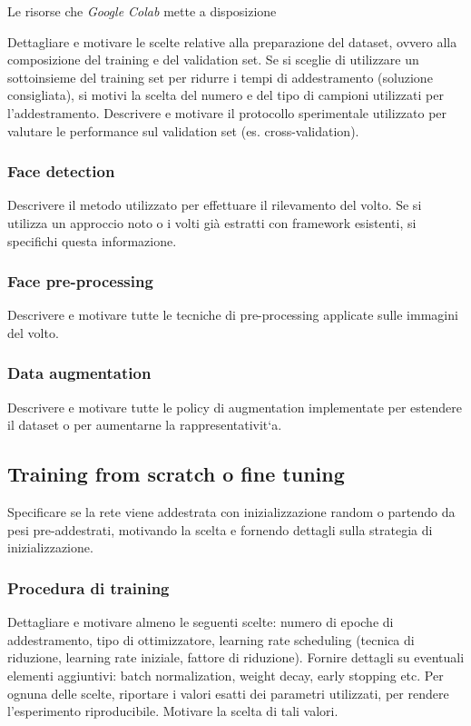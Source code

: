  Le risorse che \textit{Google Colab} mette a disposizione 

Dettagliare e motivare le scelte relative alla preparazione del dataset, ovvero alla composizione del training e del validation set. Se si sceglie di utilizzare un sottoinsieme del training set per ridurre i tempi di addestramento (soluzione consigliata), si motivi la scelta del numero e del tipo di campioni utilizzati per l’addestramento. Descrivere e motivare il protocollo sperimentale utilizzato per valutare le performance sul validation set (es. cross-validation).

\subsubsection{Face detection} 
Descrivere il metodo utilizzato per effettuare il rilevamento del volto. Se si utilizza un approccio noto o i volti già estratti con framework esistenti, si specifichi questa informazione.

\subsubsection{Face pre-processing} 
Descrivere e motivare tutte le tecniche di pre-processing applicate sulle immagini del volto.

\subsubsection{Data augmentation}
Descrivere e motivare tutte le policy di augmentation
implementate per estendere il dataset o per aumentarne la rappresentativit`a.

\subsection{Training from scratch o fine tuning}
Specificare se la rete viene addestrata
con inizializzazione random o partendo da pesi pre-addestrati, motivando la
scelta e fornendo dettagli sulla strategia di inizializzazione.

\subsubsection{Procedura di training}
Dettagliare e motivare almeno le seguenti scelte: numero di epoche di addestramento, tipo di ottimizzatore, learning rate scheduling (tecnica di riduzione, learning rate iniziale, fattore di riduzione). Fornire dettagli su eventuali elementi aggiuntivi: batch normalization, weight decay, early stopping etc. Per ognuna delle scelte, riportare i valori esatti dei parametri utilizzati, per rendere l’esperimento riproducibile. Motivare la scelta di tali valori.